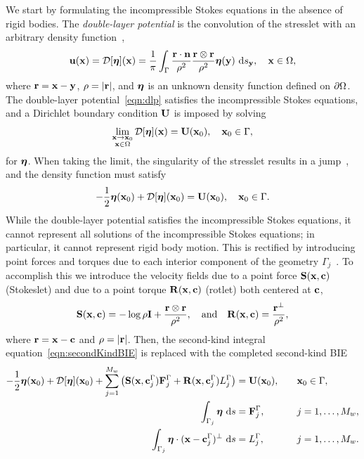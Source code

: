 \documentclass[preprint, 10pt]{elsarticle}
\begin{document}
We start by formulating the incompressible Stokes equations in the
absence of rigid bodies.  The {\em double-layer potential} is the
convolution of the stresslet with an arbitrary density
function~\cite{Ladyzhenskaya1963, Pozrikidis1992},
\begin{align}
  \label{eqn:dlp}
  {\mathbf{u}}({\mathbf{x}}) = {\mathcal{D}}[{\boldsymbol\eta}]({\mathbf{x}}) = \frac{1}{\pi}\int_{\Gamma}
  \frac{{\mathbf{r}}\cdot{\mathbf{n}}}{\rho^2}\frac{{\mathbf{r}} \otimes {\mathbf{r}}}{\rho^2}
  {\boldsymbol\eta}({\mathbf{y}})~\text{d}s_{{\mathbf{y}}}, \quad {\mathbf{x}} \in \Omega,
\end{align}
where ${\mathbf{r}} = {\mathbf{x}} - {\mathbf{y}}$, $\rho=|{\mathbf{r}}|$, and ${\boldsymbol\eta}$ is an unknown density
function defined on ${\partial}\Omega$.  The double-layer
potential~\eqref{eqn:dlp} satisfies the incompressible Stokes equations,
and a Dirichlet boundary condition ${\mathbf{U}}$ is imposed by solving
\begin{align*}
  \lim_{\substack{{\mathbf{x}} \rightarrow {\mathbf{x}}_0 \\ {\mathbf{x}} \in \Omega}}
    {\mathcal{D}}[{\boldsymbol\eta}]({\mathbf{x}}) = {\mathbf{U}}({\mathbf{x}}_0), \quad {\mathbf{x}}_0 \in \Gamma,
\end{align*}
for ${\boldsymbol\eta}$.  When taking the limit, the
singularity of the stresslet results in a jump~\cite{Pozrikidis1992},
and the density function must satisfy  
\begin{align}
  -\frac{1}{2} {\boldsymbol\eta}({\mathbf{x}}_0) + {\mathcal{D}}[{\boldsymbol\eta}]({\mathbf{x}}_0) = {\mathbf{U}}({\mathbf{x}}_0), 
    \quad {\mathbf{x}}_0 \in \Gamma.
  \label{eqn:secondKindBIE}
\end{align}
While the double-layer potential satisfies the incompressible Stokes
equations, it cannot represent all solutions of the incompressible
Stokes equations; in particular, it cannot represent rigid body motion.
This is rectified by introducing point forces and torques due to each
interior component of the geometry $\Gamma_j$~\cite{Power1987,
Power1993}.  To accomplish this we introduce the velocity fields due to a
point force $\mathbf{S}({\mathbf{x}},{\mathbf{c}})$ (Stokeslet) and due to a 
point torque $\mathbf{R}({\mathbf{x}},{\mathbf{c}})$ (rotlet) both centered at ${\mathbf{c}}$,
\begin{align*}
  \mathbf{S}({\mathbf{x}},{\mathbf{c}}) = -\log\rho\mathbf{I} + 
  \frac{{\mathbf{r}} \otimes {\mathbf{r}}}{\rho^2}, \quad \text{and} \quad
  \mathbf{R}({\mathbf{x}},{\mathbf{c}}) = \frac{{\mathbf{r}}^\perp}{\rho^2},
\end{align*}
where ${\mathbf{r}} = {\mathbf{x}} - {\mathbf{c}}$ and $\rho = |{\mathbf{r}}|$.  Then, the second-kind
integral equation~\eqref{eqn:secondKindBIE} is replaced with the
completed second-kind BIE
\begin{equation}
  \label{eqn:completed_DLP}
  \begin{split}
  -\frac{1}{2}{\boldsymbol\eta}({\mathbf{x}}_0) + {\mathcal{D}}[{\boldsymbol\eta}]({\mathbf{x}}_0) + 
    \sum_{j=1}^{M_w} \left(\mathbf{S}({\mathbf{x}},{\mathbf{c}}^\Gamma_j){\mathbf{F}}^\Gamma_j + 
      \mathbf{R}({\mathbf{x}},{\mathbf{c}}^\Gamma_j)L^\Gamma_j\right) &= {\mathbf{U}}({\mathbf{x}}_0),
      \quad &&{\mathbf{x}}_0 \in \Gamma, \\
  \int_{\Gamma_j} {\boldsymbol\eta}~\text{d}s &= {\mathbf{F}}^\Gamma_j, 
      &&j=1,\ldots,M_w, \\
  \int_{\Gamma_j} {\boldsymbol\eta}\cdot ({\mathbf{x}} - {\mathbf{c}}^\Gamma_j)^\perp~\text{d}s &=   
      L^\Gamma_j, &&j=1,\ldots,M_w.
  \end{split}
\end{equation}
\end{document}
